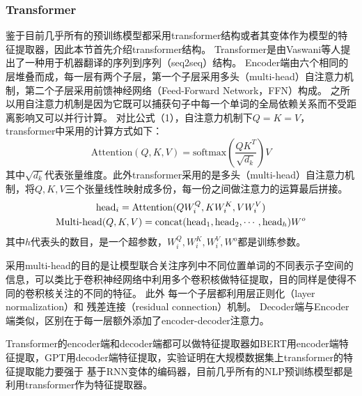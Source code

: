 \subsubsection{Transformer}\label{transformer}
鉴于目前几乎所有的预训练模型都采用transformer结构或者其变体作为模型的特征提取器，因此本节首先介绍transformer结构。
Transformer是由Vaswani等人提出了一种用于机器翻译的序列到序列（seq2seq）结构。
Encoder端由六个相同的层堆叠而成，每一层有两个子层，第一个子层采用多头（multi-head）自注意力机制，第二个子层采用前馈神经网络（Feed-Forward Network，FFN）构成。
之所以用自注意力机制是因为它既可以捕获句子中每一个单词的全局依赖关系而不受距离影响又可以并行计算。
对比公式（1），自注意力机制下$Q=K=V$，transformer中采用的计算方式如下：
\begin{equation}
\text{Attention}(Q,K,V)=\text{softmax}(\frac{QK^T}{\sqrt{d_k}})V
\end{equation}
其中$\sqrt{d_k}$代表张量维度。此外transformer采用的是多头（multi-head）自注意力机制，将$Q,K,V$三个张量线性映射成多份，每一份之间做注意力的运算最后拼接。
\begin{gather}
	\text{head}_i=\text{Attention}(QW_i^Q,KW_i^K,VW_i^V) \notag \\
	\text{Multi-head}(Q,K,V)=\text{concat}(\text{head}_1,\text{head}_2,\cdots,\text{head}_h)W^o
\end{gather}
其中$h$代表头的数目，是一个超参数，$W_i^Q,W_i^K,W_i^V,W^o$都是训练参数。

采用multi-head的目的是让模型联合关注序列中不同位置单词的不同表示子空间的信息，可以类比于卷积神经网络中利用多个卷积核做特征提取，目的同样是使得不同的卷积核关注的不同的特征。
此外
每一个子层都利用层正则化（layer normalization）和
残差连接（residual connection）机制。
Decoder端与Encoder端类似，区别在于每一层额外添加了encoder-decoder注意力。

Transformer的encoder端和decoder端都可以做特征提取器如BERT用encoder端特征提取，GPT用decoder端特征提取，实验证明在大规模数据集上transformer的特征提取能力要强于
基于RNN变体的编码器，目前几乎所有的NLP预训练模型都是利用transformer作为特征提取器。


